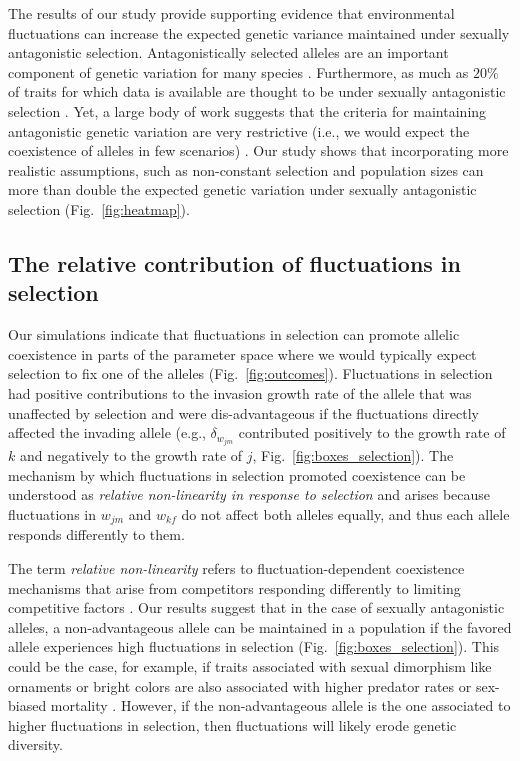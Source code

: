 The results of our study provide supporting evidence that environmental fluctuations can increase the expected genetic variance maintained under sexually antagonistic selection. Antagonistically selected alleles are an important component of genetic variation for many species \citep{foerster2007sexually,van2009intralocus,bonduriansky2009intralocus,innocenti2010sexually}. Furthermore, as much as $20\%$ of traits for which data is available are thought to be under sexually antagonistic selection \citep{morrissey2016meta}. Yet, a large body of work suggests that the criteria for maintaining antagonistic genetic variation are very restrictive (i.e., we would expect the coexistence of alleles in few scenarios) \citep{kidwell1977regions,pamilo1979genic,hedrick1999antagonistic,curtsinger1994antagonistic, patten2010fitness}. Our study shows that incorporating more realistic assumptions, such as non-constant selection and population sizes can more than double the expected genetic variation under sexually antagonistic selection (Fig.~\ref{fig:heatmap}).

\subsection*{The relative contribution of fluctuations in selection}


Our simulations indicate that fluctuations in selection can promote allelic coexistence in parts of the parameter space where we would typically expect selection to fix one of the alleles (Fig.~\ref{fig:outcomes}). Fluctuations in selection had positive contributions to the invasion growth rate of the allele that was unaffected by selection and were dis-advantageous if the fluctuations directly affected the invading allele  (e.g., $\delta_{w_{jm}}$ contributed positively to the growth rate of $k$ and negatively to the growth rate of $j$, Fig.~\ref{fig:boxes_selection}). The mechanism by which fluctuations in selection promoted coexistence can be understood as \textit{relative non-linearity in response to selection} and arises because fluctuations in $w_{jm}$ and $w_{kf}$ do not affect both alleles equally, and thus each allele responds differently to them.


The term \textit{relative non-linearity} refers to fluctuation-dependent coexistence mechanisms that arise from competitors responding differently to limiting competitive factors \citep{chesson2000general,ellner2016quantify,zepeda2019fluctuation}. Our results suggest that in the case of sexually antagonistic alleles, a non-advantageous allele can be maintained in a population if the favored allele experiences high fluctuations in selection (Fig.~\ref{fig:boxes_selection}). This could be the case, for example, if traits associated with sexual dimorphism like ornaments or bright colors are also associated with higher predator rates \citep{bildstein1989consequences,gotmark1997natural} or sex-biased mortality \citep{promislow1992mortality}. However, if the non-advantageous allele is the one associated to higher fluctuations in selection, then fluctuations will likely erode genetic diversity.


